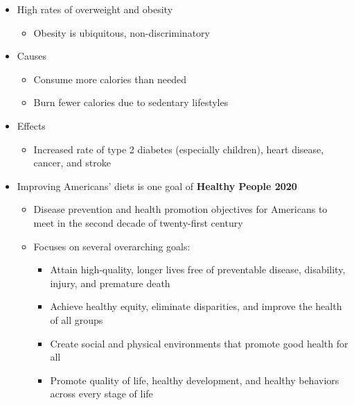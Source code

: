 \documentclass[12pt]{article}
\begin{document}
\begin{itemize}
                \item High rates of overweight and obesity
                    \begin {itemize}
                        \item Obesity is ubiquitous, non-discriminatory
                    \end{itemize}
                \item Causes
                    \begin{itemize}
                        \item Consume more calories than needed
                        \item Burn fewer calories due to sedentary lifestyles
                    \end{itemize}
                \item Effects
                    \begin{itemize}
                        \item Increased rate of type 2 diabetes (especially children), heart disease, cancer, and stroke
                    \end{itemize}
                \item Improving Americans' diets is one goal of \textbf{Healthy People 2020}
                    \begin{itemize}
                        \item Disease prevention and health promotion objectives for Americans to meet in the second decade of twenty-first century
                        \item Focuses on several overarching goals:
                            \begin{itemize}
                                \item Attain high-quality, longer lives free of preventable disease, disability, injury, and premature death
                                \item Achieve healthy equity, eliminate disparities, and improve the health of all groups
                                \item Create social and physical environments that promote good health for all
                                \item Promote quality of life, healthy development, and healthy behaviors across every stage of life
                            \end{itemize}
                    \end{itemize}
            \end{itemize}
\end{document}
